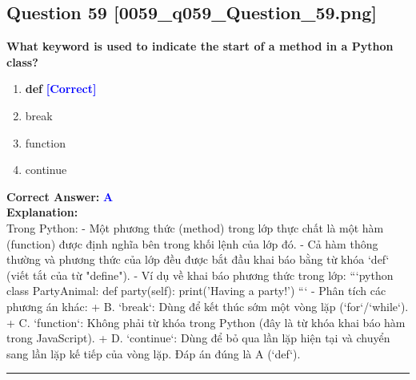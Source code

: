 \documentclass[11pt,a4paper]{article}
\begin{document}
\begin{minipage}{\textwidth}
\subsection*{Question 59 \quad \footnotesize{[0059_q059_Question_59.png]}}
\noindent \textbf{What keyword is used to indicate the start of a method in a Python class?}

\begin{enumerate}[label=\Alph*.]
    \item \textbf{def} \hfill \textcolor{blue}{\textbf{[Correct]}}
    \item break
    \item function
    \item continue
\end{enumerate}

\noindent \textbf{Correct Answer:} \textcolor{blue}{\textbf{A}} \\[4pt]
\noindent \textbf{Explanation:}\\
Trong Python:\newline
- Một phương thức (method) trong lớp thực chất là một hàm (function) được định nghĩa bên trong khối lệnh của lớp đó.\newline
- Cả hàm thông thường và phương thức của lớp đều được bắt đầu khai báo bằng từ khóa `def` (viết tắt của từ "define").\newline
- Ví dụ về khai báo phương thức trong lớp:\newline
  ```python\newline
  class PartyAnimal:\newline
      def party(self):\newline
          print('Having a party!')\newline
  ```\newline
- Phân tích các phương án khác:\newline
  + B. `break`: Dùng để kết thúc sớm một vòng lặp (`for`/`while`).\newline
  + C. `function`: Không phải từ khóa trong Python (đây là từ khóa khai báo hàm trong JavaScript).\newline
  + D. `continue`: Dùng để bỏ qua lần lặp hiện tại và chuyển sang lần lặp kế tiếp của vòng lặp.\newline
Đáp án đúng là A (`def`).
\end{minipage}
\vspace{0.8cm}
\hrule
\vspace{0.5cm}
\end{document}
